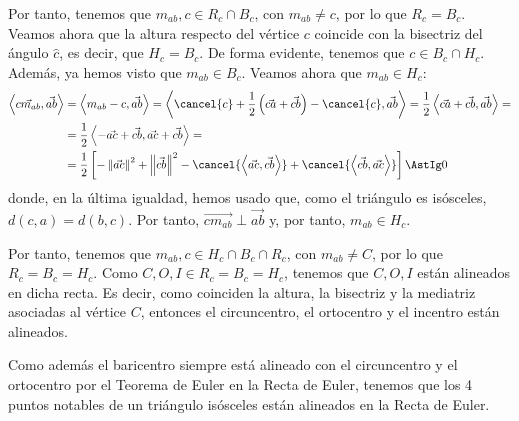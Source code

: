 \begin{ejercicio}
    Por tanto, tenemos que $m_{ab},c \in R_c \cap B_c$, con $m_{ab}\neq c$, por lo que $R_c = B_c$. Veamos ahora que la altura respecto del vértice $c$ coincide con la bisectriz del ángulo $\widehat{c}$,
    es decir, que $H_c = B_c$. De forma evidente, tenemos que $c\in B_c\cap H_c$. Además, ya hemos visto que $m_{ab}\in B_c$. Veamos ahora que $m_{ab}\in H_c$:
    \begin{align*}
        \left\langle \vec{cm_{ab}}, \vec{ab}\right\rangle &=
        \left\langle m_{ab}-c, \vec{ab}\right\rangle = \left\langle \cancel{c}+\frac{1}{2}\left(\vec{ca} + \vec{cb}\right) - \cancel{c}, \vec{ab}\right\rangle
        = \frac{1}{2}\left\langle \vec{ca} + \vec{cb}, \vec{ab}\right\rangle =\\
        &= \frac{1}{2}\left\langle -\vec{ac} + \vec{cb}, \vec{ac} + \vec{cb}\right\rangle =\\
        &= \frac{1}{2}\left[-\left\|\vec{ac}\right\|^2 + \left\|\vec{cb}\right\|^2 - \cancel{\left\langle \vec{ac}, \vec{cb}\right\rangle} + \cancel{\left\langle \vec{cb}, \vec{ac}\right\rangle}\right]
        \AstIg 0
    \end{align*}
    donde, en la última igualdad, hemos usado que, como el triángulo es isósceles, $d(c,a)=d(b,c)$. Por tanto, $\vec{cm_{ab}}\perp \vec{ab}$ y, por tanto, $m_{ab}\in H_c$.

    Por tanto, tenemos que $m_{ab},c \in H_c \cap B_c \cap R_c$, con $m_{ab}\neq C$, por lo que $R_c = B_c = H_c$. Como $C,O,I\in R_c=B_c=H_c$, tenemos que $C,O,I$ están alineados en dicha recta.
    Es decir, como coinciden la altura, la bisectriz y la mediatriz asociadas al vértice $C$, entonces el circuncentro, el ortocentro y el incentro están alineados.

    Como además el baricentro siempre está alineado con el circuncentro y el ortocentro por el Teorema de Euler en la Recta de Euler, tenemos que los 4 puntos notables de un triángulo isósceles están alineados en la Recta de Euler.
\end{ejercicio}